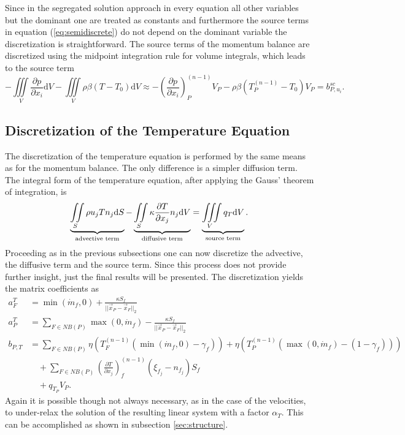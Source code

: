Since in the segregated solution approach in every equation all other variables but the dominant one are treated as constants and furthermore the source terms in equation (\ref{eq:semidiscrete}) do not depend on the dominant variable the discretization is straightforward. The source terms of the momentum balance are discretized using the midpoint integration rule for volume integrals, which leads to the source term
\begin{equation}
  - \iiint\limits_V \frac{\partial p}{\partial x_i} \mathrm{d}V
  - \iiint\limits_V \rho \beta \left(T - T_0\right) \mathrm{d}V
  \approx
  - \left(\frac{\partial p}{\partial x_i}\right)_P^{(n-1)} V_P
  - \rho \beta \left(T_P^{(n-1)} - T_0\right) V_P
  = b_{P,u_i}^{sc}.
\end{equation}

\subsection{Discretization of the Temperature Equation}
\label{sec:discretetemperature}

The discretization of the temperature equation is performed by the same means as for the momentum balance. The only difference is a simpler diffusion term. The integral form of the temperature equation, after applying the Gauss' theorem of integration, is
\begin{displaymath}
  \underbrace{ \iint\limits_S \rho u_j T n_j \mathrm{d}S }_{\text{advective term}}
  - \underbrace{ \iint\limits_S \kappa \frac{\partial T}{\partial x_j} n_j \mathrm{d}V }_{\text{diffusive term}}
  = \underbrace{\iiint\limits_V \vphantom{\frac{ T}{ x_j} } q_T \mathrm{d}V }_{\text{source term}}.
\end{displaymath}
Proceeding as in the previous subsections one can now discretize the advective, the diffusive term and the source term. Since this process does not provide further insight, just the final results will be presented. The discretization yields the matrix coefficients as
\begin{subequations}
  \begin{align}
    a_F^{T} &= \min(\dot{m}_f,0) + \frac{\kappa S_f}{||\vec{x}_P - \vec{x}_F||_2} \\[1em]
    a_P^{T} &= \sum_{F \in NB(P)}\max(0,\dot{m}_f) - \frac{\kappa S_f}{||\vec{x}_P - \vec{x}_F||_2} \\[1em]
    b_{P,T} &= \sum_{F \in NB(P)} \eta  \left(T_F^{(n-1)} \left( \min(\dot{m}_f,0) - \gamma_f \right)\right) 
             + \eta \left( T_{P}^{(n-1)} \left( \max(0,\dot{m}_f) - \left(1 - \gamma_f\right) \right)\right) \nonumber \\[0.5em]
            &\quad + \sum_{F \in NB(P)} \left( \frac{\partial T}{\partial x_j}\right)_f^{(n-1)} \left(\xi_{f_j} - n_{f_j}\right)S_f \nonumber \\[0.5em]
            &\quad + q_{T_P} V_P.
  \end{align}
\end{subequations}
Again it is possible though not always necessary, as in the case of the velocities, to under-relax the solution of the resulting linear system with a factor \(\alpha_T\). This can be accomplished as shown in subsection \ref{sec:structure}.


